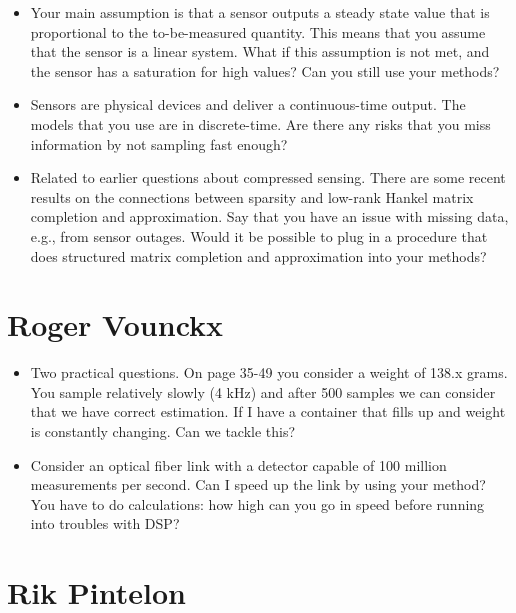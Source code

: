 \documentclass[11pt]{article}
\begin{document}
\begin{itemize}

    \item Your main assumption is that a sensor outputs a steady state value that is proportional to the to-be-measured quantity. This means that you assume that the sensor is a linear system. What if this assumption is not met, and the sensor has a saturation for high values? Can you still use your methods?

	\item  Sensors are physical devices and deliver a continuous-time output. The models that you use are in discrete-time. Are there any risks that you miss information by not sampling fast enough?
	
	\item  Related to earlier questions about compressed sensing. There are some recent results on the connections between sparsity and low-rank Hankel matrix completion and approximation. Say that you have an issue with missing data, e.g., from sensor outages. Would it be possible to plug in a procedure that does structured matrix completion and approximation into your methods?

\end{itemize}

\section*{Roger Vounckx}

\begin{itemize}
	\item Two practical questions. On page 35-49 you consider a weight of 138.x grams. You sample relatively slowly (4 kHz) and after 500 samples we can consider that we have correct estimation. If I have a container that fills up and weight is constantly changing. Can we tackle this?
	
	\item  Consider an optical fiber link with a detector capable of 100 million measurements per second. Can I speed up the link by using your method? You have to do calculations: how high can you go in speed before running into troubles with DSP?
	
\end{itemize}

\section*{Rik Pintelon}
\end{document}
